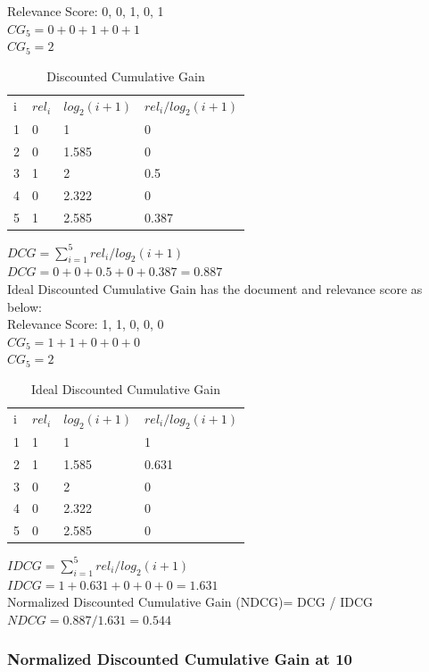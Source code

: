 \documentclass[12pt]{report}
\begin{document}
Relevance Score: 0, 0, 1, 0, 1\\
$CG_5 = 0+ 0+ 1+ 0+ 1$\\
$CG_5 = 2$ \\
\begin{table}[]
\centering
\caption{Discounted Cumulative Gain}
\label{my-label}
\begin{tabular}{llll}
i & $rel_i$ & $log_2(i + 1)$   & $rel_i / log_2(i + 1)$  \\
1 & 0        & 1     		    & 0   \\
2 & 0        & 1.585 		    & 0 \\
3 & 1        & 2     		    & 0.5  \\
4 & 0        & 2.322 		    & 0 \\
5 & 1        & 2.585 		    & 0.387   
\end{tabular}
\end{table}
$DCG = \sum\limits_{i=1}^5 rel_i / log_2(i + 1)$ \\
$DCG = 0 + 0 + 0.5 + 0 + 0.387 =  0.887$\\

Ideal Discounted Cumulative Gain has the document and relevance score as below:\\
Relevance Score: 1, 1, 0, 0, 0\\
$CG_5 = 1+ 1+ 0+ 0+ 0$\\
$CG_5 = 2$ \\
\begin{table}[]
\centering
\caption{Ideal Discounted Cumulative Gain}
\label{my-label}
\begin{tabular}{llll}
i & $rel_i$ & $log_2(i + 1)$   & $rel_i / log_2(i + 1)$  \\
1 & 1        & 1     		    & 1    \\
2 & 1        & 1.585 		    & 0.631 \\
3 & 0        & 2     		    & 0  \\
4 & 0        & 2.322 		    & 0 \\
5 & 0        & 2.585 		    & 0   
\end{tabular}
\end{table}
$IDCG = \sum\limits_{i=1}^5 rel_i / log_2(i + 1)$ \\
$IDCG = 1 + 0.631 + 0 + 0 + 0 =  1.631$\\
Normalized Discounted Cumulative Gain (NDCG)=  DCG / IDCG\\
$NDCG = 0.887 / 1.631 = 0.544$

\subsubsection{Normalized Discounted Cumulative Gain at 10}
\end{document}

